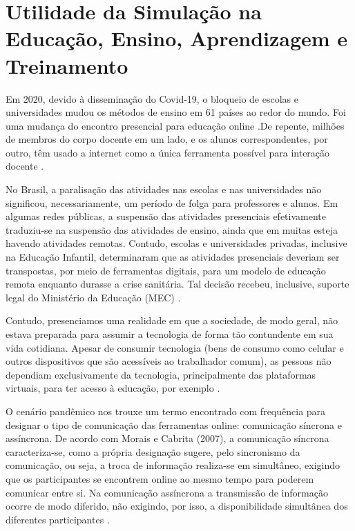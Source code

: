 \section{Utilidade da Simulação na Educação, Ensino, Aprendizagem e Treinamento}


Em 2020, devido à disseminação do Covid-19, o bloqueio de escolas e universidades mudou os métodos de ensino em 61 países ao redor do mundo. Foi uma mudança do encontro presencial para educação online \cite{UNESCO2020:online}.De repente, milhões de membros do corpo docente em um lado, e os alunos correspondentes, por outro, têm usado a internet como a única ferramenta possível para interação docente \cite{BAO2020:online}.

No Brasil, a paralisação das atividades nas escolas e nas universidades não significou, necessariamente, um período de folga para professores e alunos. Em algumas redes públicas, a suspensão das atividades presenciais efetivamente traduziu-se na suspensão das atividades de ensino, ainda que em muitas esteja havendo atividades remotas. Contudo, escolas e universidades privadas, inclusive na Educação Infantil, determinaram que as atividades presenciais deveriam ser transpostas, por meio de ferramentas digitais, para um modelo de educação remota enquanto durasse a crise sanitária. Tal decisão recebeu, inclusive, suporte legal do Ministério da Educação (MEC) \cite{saraiva2020educacao}.

Contudo, presenciamos uma realidade em que a sociedade, de modo geral, não estava preparada para assumir  a  tecnologia  de  forma  tão  contundente  em  sua  vida cotidiana.  Apesar  de  consumir  tecnologia  (bens  de  consumo  como  celular e outros  dispositivos  que  são  acessíveis  ao  trabalhador  comum),  as  pessoas não dependiam exclusivamente da tecnologia, principalmente das plataformas virtuais, para ter acesso à educação, por exemplo \cite{miranda2021formacao}.

O cenário pandêmico nos trouxe um termo encontrado com frequência para designar o tipo de comunicação das ferramentas online: comunicação síncrona e assíncrona. De acordo com Morais e Cabrita (2007), a comunicação síncrona caracteriza-se, como a própria designação sugere, pelo sincronismo da comunicação, ou seja, a troca de informação realiza-se em simultâneo, exigindo que os participantes se encontrem online ao mesmo tempo para poderem comunicar entre si. Na comunicação assíncrona a transmissão de informação ocorre de modo diferido, não exigindo, por isso, a disponibilidade simultânea dos diferentes participantes \cite{morais2007ambientes}.

